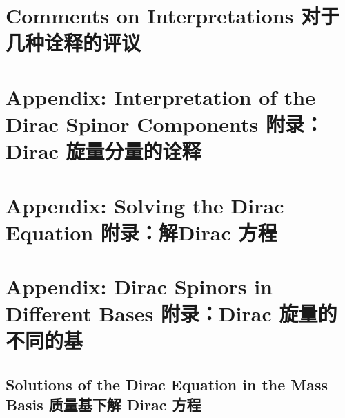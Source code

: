 \section[对于几种诠释的评议]{Comments on Interpretations 对于几种诠释的评议}\label{sec8.7}
\section[附录：Dirac 旋量分量的诠释]{Appendix: Interpretation of the Dirac Spinor Components 附录：Dirac 旋量分量的诠释}\label{sec8.8}
\section[附录：解Dirac 方程]{Appendix: Solving the Dirac Equation 附录：解Dirac 方程}\label{sec8.9}
\section[附录：Dirac 旋量的不同的基]{Appendix: Dirac Spinors in Different Bases 附录：Dirac 旋量的不同的基}\label{sec8.10}
\subsection[质量基下解 Dirac 方程]{Solutions of the Dirac Equation in the Mass Basis 质量基下解 Dirac 方程}\label{sec8.10.1}
